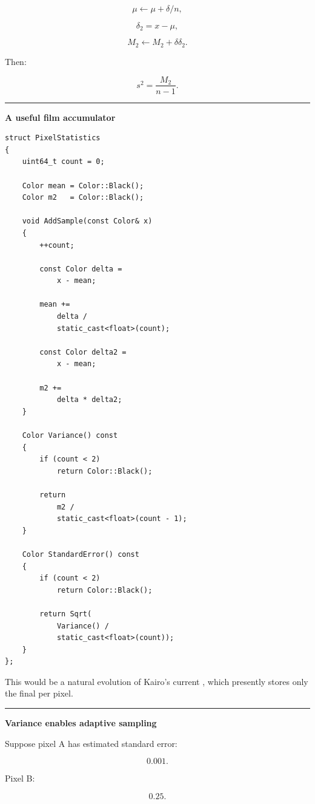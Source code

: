 \[
\mu\leftarrow\mu+\delta/n,
\]

\[
\delta_2=x-\mu,
\]

\[
M_2\leftarrow M_2+\delta\delta_2.
\]

Then:

\[
\boxed{
s^2=
\frac{M_2}{n-1}.
}
\]

\begin{center}\rule{0.5\linewidth}{0.5pt}\end{center}

\textbf{A useful film accumulator}

\begin{verbatim}
struct PixelStatistics
{
    uint64_t count = 0;

    Color mean = Color::Black();
    Color m2   = Color::Black();

    void AddSample(const Color& x)
    {
        ++count;

        const Color delta =
            x - mean;

        mean +=
            delta /
            static_cast<float>(count);

        const Color delta2 =
            x - mean;

        m2 +=
            delta * delta2;
    }

    Color Variance() const
    {
        if (count < 2)
            return Color::Black();

        return
            m2 /
            static_cast<float>(count - 1);
    }

    Color StandardError() const
    {
        if (count < 2)
            return Color::Black();

        return Sqrt(
            Variance() /
            static_cast<float>(count));
    }
};
\end{verbatim}

This would be a natural evolution of Kairo's current , which presently stores only the final  per pixel.

\begin{center}\rule{0.5\linewidth}{0.5pt}\end{center}

\textbf{Variance enables adaptive sampling}

Suppose pixel A has estimated standard error:

\[
0.001.
\]

Pixel B:

\[
0.25.
\]


